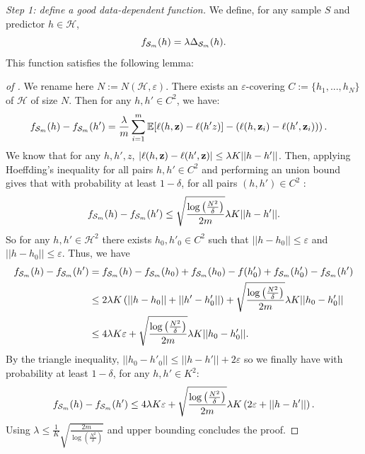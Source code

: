 \textit{Step 1: define a good data-dependent function.} We define, for any sample $S$ and predictor $h\in \mathcal{H}$,
\[ f_{\mathcal{S}_m}(h) = \lambda \Delta_{\mathcal{S}_m}(h). \]
This function satisfies the following lemma:
\begin{proof}[of ]
We rename here $N:= N(\mathcal{H},\varepsilon)$. There exists an $\varepsilon$-covering $C:=\{h_1,...,h_N\}$ of $\mathcal{H}$ of size $N$.
Then for any $h,h'\in C^2$, we have:
\begin{align*}
f_{\mathcal{S}_m}(h)-f_{\mathcal{S}_m}(h')  & = \frac{\lambda}{m}\sum_{i=1}^m \mathbb{E}[\ell(h,\mathbf{z})-\ell(h'z)] - \left(\ell(h,\mathbf{z}_i)-\ell(h',\mathbf{z}_i))\right).
\end{align*}
We know that for any $h,h',z$, $|\ell(h,\mathbf{z})-\ell(h',\mathbf{z})| \leq \lambda K||h-h'||$. Then, applying Hoeffding's inequality for all pairs $h,h'\in C^2$ and performing an union bound gives that with probability at least $1-\delta$, for all pairs $(h,h')\in C^2$ :
\begin{align*}
f_{\mathcal{S}_m}(h)-f_{\mathcal{S}_m}(h')  \leq \sqrt{\frac{\log\left(\frac{N^2}{\delta}\right)}{2m}} \lambda K ||h-h'||.
\end{align*}
So for any $h,h'\in \mathcal{H}^2$ there exists $h_0,h'_0\in C^2$ such that $||h-h_0||\leq \varepsilon$ and $||h-h_0||\leq \varepsilon$. Thus, we have
\begin{align*}
f_{\mathcal{S}_m}(h)-f_{\mathcal{S}_m}(h')  & = f_{\mathcal{S}_m}(h)-f_{\mathcal{S}_m}(h_0) + f_{\mathcal{S}_m}(h_0)-f(h'_0)+ f_{\mathcal{S}_m}(h'_0)-f_{\mathcal{S}_m}(h') \\
& \leq 2\lambda K \left(||h-h_0|| + ||h'-h'_0||\right) + \sqrt{\frac{\log\left(\frac{N^2}{\delta}\right)}{2m}} \lambda K ||h_0-h_0'|| \\
& \leq 4\lambda K \varepsilon + \sqrt{\frac{\log\left(\frac{N^2}{\delta}\right)}{2m}} \lambda K ||h_0-h'_0||.
\end{align*}
By the triangle inequality, $||h_0-h'_0||\leq ||h-h'|| + 2\varepsilon$ so we finally have with probability at least $1-\delta$, for any $h,h'\in K^2$:
\[  f_{\mathcal{S}_m}(h)-f_{\mathcal{S}_m}(h') \leq 4\lambda K \varepsilon + \sqrt{\frac{\log\left(\frac{N^2}{\delta}\right)}{2m}} \lambda K \left( 2\varepsilon+ ||h-h'||\right).\]
Using $\lambda \leq \frac{1}{K}\sqrt{\frac{2m}{\log\left(\frac{N^2}{\delta}\right)}}$ and upper bounding concludes the proof.
\end{proof}


